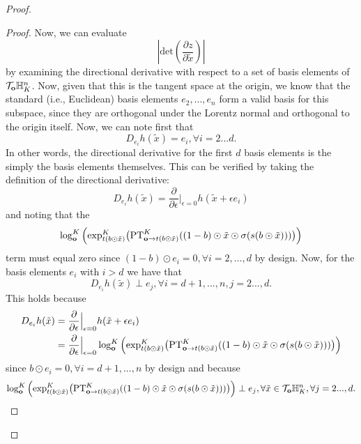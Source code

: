 \begin{proof}
\begin{proof}
Now, we can evaluate 
$$
\left|\textrm{det}\left(\frac{\partial z}{\partial \tilde{x}}\right)\right|
$$
by examining the directional derivative with respect to a set of basis elements of $\mathcal{T}_{\mathbf{o}}\mathbb{H}^{n}_K$.
Now, given that this is the tangent space at the origin, we know that the standard (i.e., Euclidean) basis elements $e_2, ..., e_n$ form a valid basis for this subspace, since they are orthogonal under the Lorentz normal and orthogonal to the origin itself. 
Now, we can note first that
\begin{equation}
    D_{e_i}h(\tilde{x}) = e_i, \forall i=2...d.
\end{equation}
In other words, the directional derivative for the first $d$ basis elements is the simply the basis elements themselves. This can be verified by taking the definition of the directional derivative:
\begin{equation}
     D_{e_i}h(\tilde{x})  = \frac{\partial}{\partial \epsilon}\Big|_{\epsilon = 0}h(\tilde{x} + \epsilon e_i)
\end{equation}
and noting that the 
$$
\log^K_{\textbf{o}}\Big( \textnormal{exp}^K_{t(b \odot \tilde{x})}\big(\textnormal{PT}^K_{\textbf{o}\to t(b \odot \tilde{x}) }((1-b) \odot \tilde{x} \odot \sigma(s(b \odot \tilde{x})))\big)\Big)
$$
term must equal zero since $(1-b)\odot e_i = 0, \forall i = 2, ..., d$ by design. 
Now, for the basis elements $e_i$ with $i>d$ we have that
\begin{equation}
     D_{e_i}h(\tilde{x}) \perp e_j, \forall i=d+1, ..., n, j=2...,d.
\end{equation}
This holds because 
\begin{align}
D_{e_i}h(\tilde{x})  &= \frac{\partial}{\partial \epsilon}\Big|_{\epsilon = 0}h(\tilde{x} + \epsilon e_i) \\
 &= \frac{\partial}{\partial \epsilon}\Big|_{\epsilon = 0}    \log^K_{\textbf{o}}\Big( \textnormal{exp}^K_{t(b \odot \tilde{x})}\big(\textnormal{PT}^K_{\textbf{o}\to t(b \odot \tilde{x}) }((1-b) \odot \tilde{x} \odot \sigma(s(b \odot \tilde{x})))\big)\Big) 
\end{align}
since $b \odot e_i = 0, \forall i = d+1, ..., n$ by design and because
\begin{equation}
   \log^K_{\textbf{o}}\Big( \textnormal{exp}^K_{t(b \odot \tilde{x})}\big(\textnormal{PT}^K_{\textbf{o}\to t(b \odot \tilde{x}) }((1-b) \odot \tilde{x} \odot \sigma(s(b \odot \tilde{x})))\big)\Big) \perp e_j, \forall \tilde{x} \in \mathcal{T}_{\mathbf{o}}\mathbb{H}^n_K, \forall  j=2...,d.
\end{equation}

\end{proof}
\end{proof}

